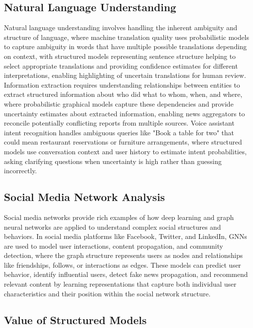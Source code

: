 \subsection{Natural Language Understanding}

Natural language understanding involves handling the inherent ambiguity and structure of language, where machine translation quality uses probabilistic models to capture ambiguity in words that have multiple possible translations depending on context, with structured models representing sentence structure helping to select appropriate translations and providing confidence estimates for different interpretations, enabling highlighting of uncertain translations for human review. Information extraction requires understanding relationships between entities to extract structured information about who did what to whom, when, and where, where probabilistic graphical models capture these dependencies and provide uncertainty estimates about extracted information, enabling news aggregators to reconcile potentially conflicting reports from multiple sources. Voice assistant intent recognition handles ambiguous queries like "Book a table for two" that could mean restaurant reservations or furniture arrangements, where structured models use conversation context and user history to estimate intent probabilities, asking clarifying questions when uncertainty is high rather than guessing incorrectly.

\subsection{Social Media Network Analysis}

Social media networks provide rich examples of how deep learning and graph neural networks are applied to understand complex social structures and behaviors. In social media platforms like Facebook, Twitter, and LinkedIn, GNNs are used to model user interactions, content propagation, and community detection, where the graph structure represents users as nodes and relationships like friendships, follows, or interactions as edges. These models can predict user behavior, identify influential users, detect fake news propagation, and recommend relevant content by learning representations that capture both individual user characteristics and their position within the social network structure.

\subsection{Value of Structured Models}

